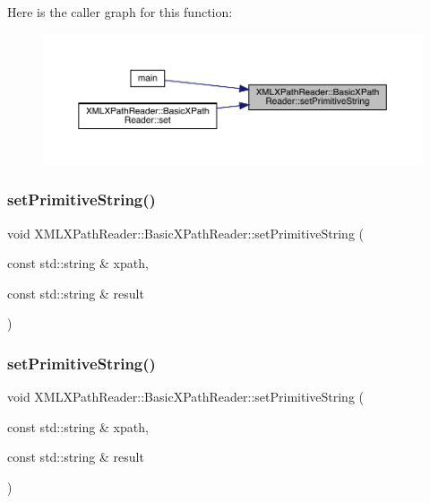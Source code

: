 Here is the caller graph for this function\+:
\nopagebreak
\begin{figure}[H]
\begin{center}
\leavevmode
\includegraphics[width=350pt]{d6/dbf/classXMLXPathReader_1_1BasicXPathReader_a1cc6aa3e855c995ebd874c475a68a076_icgraph}
\end{center}
\end{figure}
\mbox{\label{classXMLXPathReader_1_1BasicXPathReader_a76d2a9f9bc292c92558619e47b85dd4c}} 
\subsubsection{\texorpdfstring{setPrimitiveString()}{setPrimitiveString()}\hspace{0.1cm}{\footnotesize\ttfamily [2/3]}}
{\footnotesize\ttfamily void X\+M\+L\+X\+Path\+Reader\+::\+Basic\+X\+Path\+Reader\+::set\+Primitive\+String (\begin{DoxyParamCaption}\item[{const std\+::string \&}]{xpath,  }\item[{const std\+::string \&}]{result }\end{DoxyParamCaption})}

\mbox{\label{classXMLXPathReader_1_1BasicXPathReader_a76d2a9f9bc292c92558619e47b85dd4c}} 
\subsubsection{\texorpdfstring{setPrimitiveString()}{setPrimitiveString()}\hspace{0.1cm}{\footnotesize\ttfamily [3/3]}}
{\footnotesize\ttfamily void X\+M\+L\+X\+Path\+Reader\+::\+Basic\+X\+Path\+Reader\+::set\+Primitive\+String (\begin{DoxyParamCaption}\item[{const std\+::string \&}]{xpath,  }\item[{const std\+::string \&}]{result }\end{DoxyParamCaption})}



